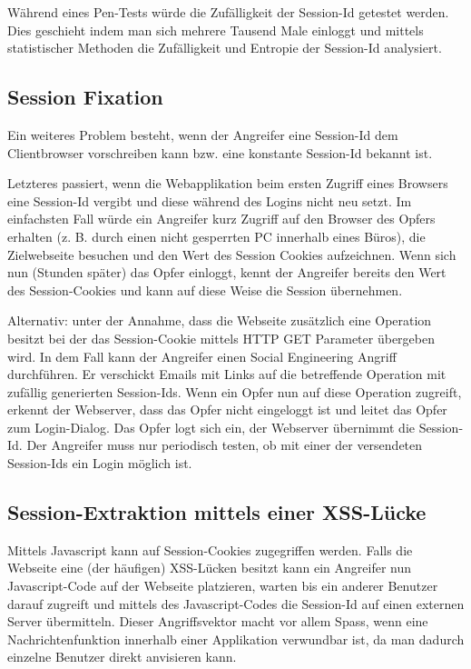Während eines Pen-Tests würde die Zufälligkeit der Session-Id getestet werden. Dies geschieht indem man sich mehrere Tausend Male einloggt und mittels statistischer Methoden die Zufälligkeit und Entropie der Session-Id analysiert.

\subsection{Session Fixation}

Ein weiteres Problem besteht, wenn der Angreifer eine Session-Id dem Clientbrowser vorschreiben kann bzw. eine konstante Session-Id bekannt ist.

Letzteres passiert, wenn die Webapplikation beim ersten Zugriff eines Browsers eine Session-Id vergibt und diese während des Logins nicht neu setzt. Im einfachsten Fall würde ein Angreifer kurz Zugriff auf den Browser des Opfers erhalten (z. B. durch einen nicht gesperrten PC innerhalb eines Büros), die Zielwebseite besuchen und den Wert des Session Cookies aufzeichnen. Wenn sich nun (Stunden später) das Opfer einloggt, kennt der Angreifer bereits den Wert des Session-Cookies und kann auf diese Weise die Session übernehmen.

Alternativ: unter der Annahme, dass die Webseite zusätzlich eine Operation besitzt bei der das Session-Cookie mittels HTTP GET Parameter übergeben wird. In dem Fall kann der Angreifer einen Social Engineering Angriff durchführen. Er verschickt Emails mit Links auf die betreffende Operation mit zufällig generierten Session-Ids. Wenn ein Opfer nun auf diese Operation zugreift, erkennt der Webserver, dass das Opfer nicht eingeloggt ist und leitet das Opfer zum Login-Dialog. Das Opfer logt sich ein, der Webserver übernimmt die Session-Id. Der Angreifer muss nur periodisch testen, ob mit einer der versendeten Session-Ids ein Login möglich ist.

\subsection{Session-Extraktion mittels einer XSS-Lücke}

Mittels Javascript kann auf Session-Cookies zugegriffen werden. Falls die Webseite eine (der häufigen) XSS-Lücken besitzt kann ein Angreifer nun Javascript-Code auf der Webseite platzieren, warten bis ein anderer Benutzer darauf zugreift und mittels des Javascript-Codes die Session-Id auf einen externen Server übermitteln. Dieser Angriffsvektor macht vor allem Spass, wenn eine Nachrichtenfunktion innerhalb einer Applikation verwundbar ist, da man dadurch einzelne Benutzer direkt anvisieren kann.

